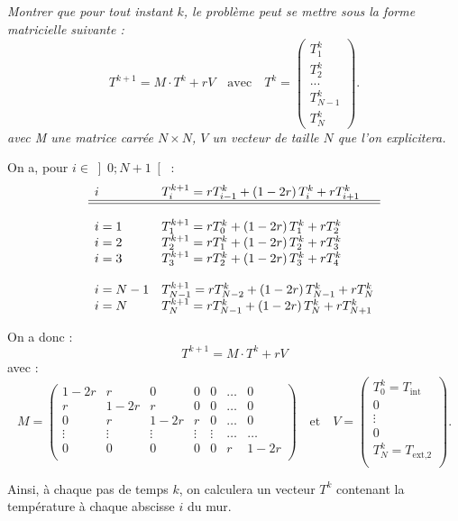 \documentclass[10pt,fleqn]{article} %
\begin{document}
\begin{multicols}{2}
\begin{multicols}{2}
\subparagraph{}\textit{Montrer que pour tout instant $k$, le problème peut se mettre sous la forme matricielle suivante : }
$$
T^{k+1} = M \cdot T^k + rV \quad \text{avec} \quad T^k =
 \begin{pmatrix} T_1^k \\  T_2 ^k \\ ... \\  T_{N-1}^{k} \\ T_{N}^{k}  \end{pmatrix}.
$$
\textit{avec M une matrice carrée $N\times N$, $V$ un vecteur de taille $N$ que l'on explicitera.}
\ifprof
\begin{corrige}
On a, pour $i\in \left]0;N+1 \right[$ :
$$
\begin{array}{ll}
i & T_{i}^{k+1} = r T_{i-1}^{k} + \left( 1-2r \right) T_i^k + r T_{i+1}^k \\
\hline 
\hline 
\\
i=1 & T_{1}^{k+1} = r T_{0}^{k} + \left( 1-2r \right) T_1^k + r T_{2}^k \\
i=2 & T_{2}^{k+1} = r T_{1}^{k} + \left( 1-2r \right) T_2^k + r T_{3}^k \\
i=3 & T_{3}^{k+1} = r T_{2}^{k} + \left( 1-2r \right) T_3^k + r T_{4}^k \\
&\\
i=N -1& T_{N -1}^{k+1} = r T_{N -2}^{k} + \left( 1-2r \right) T_{N -1}^k + r T_{N}^k \\
i=N & T_{N}^{k+1} = r T_{N-1}^{k} + \left( 1-2r \right) T_N^k + r T_{N+1}^k \\
\end{array}
$$ 

On a donc : 
$$
T^{k+1} = M \cdot T^k + rV
$$
avec :
$$
M = 
\begin{pmatrix}
1-2r & r     & 0 & 0 & 0 &  \ldots & 0 \\
r     & 1-2r & r & 0 & 0  & \ldots &  0 \\
0    & r & 1-2r & r & 0   & \ldots&  0 \\
\vdots & \vdots & \vdots & \vdots & \vdots & \ldots & \ldots \\
0& 0& 0& 0& 0& r & 1-2r\\
\end{pmatrix}
\quad \text{et} \quad 
V = \begin{pmatrix}
T_0^k = T_{\text{int}} \\
0 \\
\vdots \\
0 \\
T_N^k = T_{\text{ext,2}} \\
\end{pmatrix}.
$$
\end{corrige}
\else
\fi
\ifprof
\else
\vspace{.5cm}
Ainsi, à chaque pas de temps $k$, on calculera un vecteur $T^k$ contenant la température à chaque abscisse $i$ du mur.


\end{multicols}
\end{multicols}
\end{document}
